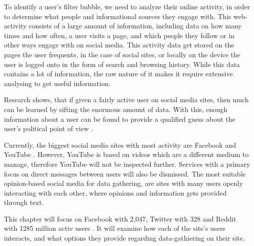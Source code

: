 
To identify a user's filter bubble, we need to analyze their online activity, in
order to determine what people and informational sources they engage with. This
web-activity consists of a large amount of information, including data on how
many times and how often, a user visits a page, and which people they follow or
in other ways engage with on social media. This activity data get stored on the
pages the user frequents, in the case of social sites, or locally on the device
the user is logged onto in the form of search and browsing history. While this
data contains a lot of information, the raw nature of it makes it require
extensive analysing to get useful information.\nl

Research shows, that if given a fairly active user on social media sites, then
much can be learned by sifting the enormous amount of data. With this, enough
information about a user can be found to provide a qualified guess about the
user's political point of view \citep{Personality} \KT.\nl

Currently, the biggest social media sites with most activity are Facebook and
YouTube \citep{SocialMediaStats}. However, YouTube is based on videos which are
a different medium to manage, therefore YouTube will not be inspected further.
Services with a primary focus on direct messages between users will also be
dismissed. The most suitable opinion-based social media for data gathering, are
sites with many users openly interacting with each other, where opinions and
information gets provided through text.\nl

This chapter will focus on Facebook with 2,047, Twitter with 328 and Reddit with
1285 million activ users \citep{FacebookPopularity}. It will examine how each of
the site's users interacts, and what options they provide regarding data-gathiering
on their site.

